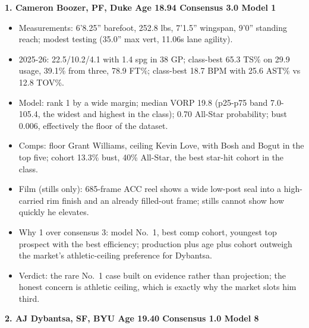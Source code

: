 \documentclass[
  10pt,
]{article}
\providecommand{\tightlist}{%
  \setlength{\itemsep}{0pt}\setlength{\parskip}{0pt}}
\begin{document}
\textbf{1. Cameron Boozer, PF, Duke \textbar{} Age 18.94 \textbar{} Consensus
3.0 \textbar{} Model 1}

\begin{itemize}
\tightlist
\item
  Measurements: 6'8.25'' barefoot, 252.8 lbs, 7'1.5'' wingspan, 9'0'' standing
  reach; modest testing (35.0'' max vert, 11.06s lane agility).
\item
  2025-26: 22.5/10.2/4.1 with 1.4 spg in 38 GP; class-best 65.3 TS\% on 29.9
  usage, 39.1\% from three, 78.9 FT\%; class-best 18.7 BPM with 25.6 AST\% vs
  12.8 TOV\%.
\item
  Model: rank 1 by a wide margin; median VORP 19.8 (p25-p75 band 7.0-105.4, the
  widest and highest in the class); 0.70 All-Star probability; bust 0.006,
  effectively the floor of the dataset.
\item
  Comps: floor Grant Williams, ceiling Kevin Love, with Bosh and Bogut in the
  top five; cohort 13.3\% bust, 40\% All-Star, the best star-hit cohort in the
  class.
\item
  Film (stills only): 685-frame ACC reel shows a wide low-post seal into a
  high-carried rim finish and an already filled-out frame; stills cannot show
  how quickly he elevates.
\item
  Why 1 over consensus 3: model No.~1, best comp cohort, youngest top prospect
  with the best efficiency; production plus age plus cohort outweigh the
  market's athletic-ceiling preference for Dybantsa.
\item
  Verdict: the rare No.~1 case built on evidence rather than projection; the
  honest concern is athletic ceiling, which is exactly why the market slots him
  third.
\end{itemize}

\textbf{2. AJ Dybantsa, SF, BYU \textbar{} Age 19.40 \textbar{} Consensus 1.0
\textbar{} Model 8}
\end{document}
